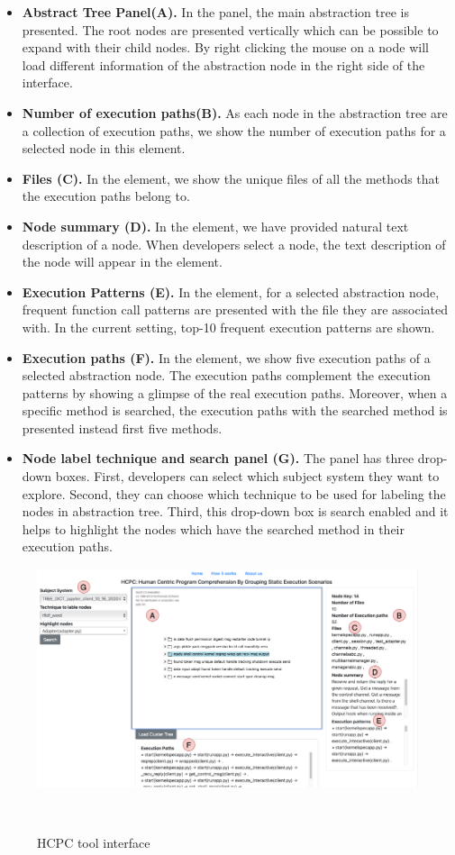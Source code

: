 \begin{itemize}
    \item \textbf{Abstract Tree Panel(A).} In the panel, the main abstraction tree is presented. The root nodes are presented vertically which can be possible to expand with their child nodes. By right clicking the mouse on a node will load different information of the abstraction node in the right side of the interface.
    \item \textbf{Number of execution paths(B).} As each node in the abstraction tree are a collection of execution paths, we show the number of execution paths for a selected node in this element.
    \item \textbf{Files (C).} In the element, we show the unique files of all the methods that the execution paths belong to.
    \item \textbf{Node summary (D).} In the element, we have provided natural text description of a node. When developers select a node, the text description of the node will appear in the element. 
    \item \textbf{Execution Patterns (E).} In the element, for a selected abstraction node, frequent function call patterns are presented with the file they are associated with. In the current setting, top-10 frequent execution patterns are shown. 
    
    \item \textbf{Execution paths (F).} In the element, we show five execution paths of a selected abstraction node. The execution paths complement the execution patterns by showing a glimpse of the real execution paths. Moreover, when a specific method is searched, the execution paths with the searched method is presented instead first five methods.
    
    \item \textbf{ Node label technique and search panel (G).} The panel has three drop-down boxes. First, developers can select which subject system they want to explore. Second, they can choose which technique to be used for labeling the nodes in abstraction tree. Third, this drop-down box is search enabled and it helps to highlight the nodes which have the searched method in their execution paths.
\end{itemize}

\begin{figure}[h]
  \centering
  \includegraphics[width=\columnwidth]{figures/hla3/hla3_interface.png}
  \caption{HCPC tool interface }~\label{fig:interface}
\end{figure}


